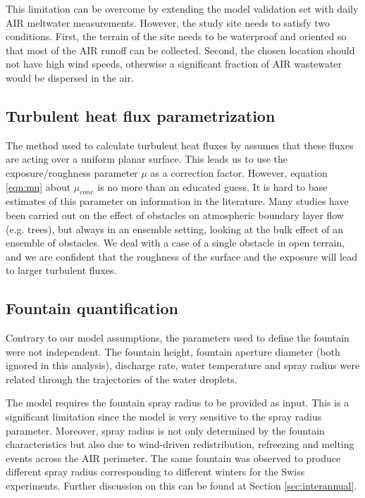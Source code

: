 This limitation can be overcome by extending the model validation set with daily AIR meltwater measurements.
However, the study site needs to satisfy two conditions. First, the terrain of the site needs to be waterproof
and oriented so that most of the AIR runoff can be collected. Second, the chosen location should not have high
wind speeds, otherwise a significant fraction of AIR wastewater would be dispersed in the air.

\subsection{Turbulent heat flux parametrization}


The method used to calculate turbulent heat fluxes by \citet{garrattAtmosphericBoundaryLayer1992} assumes that
these fluxes are acting over a uniform planar surface. This leads us to use the exposure/roughness parameter
$\mu$ as a correction factor. However, equation \ref{eqn:mu} about $\mu_{cone}$ is no more than an educated guess. It
is hard to base estimates of this parameter on information in the literature. Many studies have been carried out
on the effect of obstacles on atmospheric boundary layer flow (e.g. trees), but always in an ensemble setting,
looking at the bulk effect of an ensemble of obstacles. We deal with a case of a single obstacle in open
terrain, and we are confident that the roughness of the surface and the exposure will lead to larger turbulent
fluxes.

\subsection{Fountain quantification}

Contrary to our model assumptions, the parameters used to define the fountain were not independent. The fountain
height, fountain aperture diameter (both ignored in this analysis), discharge rate, water temperature and spray
radius were related through the trajectories of the water droplets.

The model requires the fountain spray radius to be provided as input. This is a significant limitation since the
model is very sensitive to the spray radius parameter. Moreover, spray radius is not only determined by the fountain
characteristics but also due to wind-driven redistribution, refreezing and melting events across the AIR
perimeter. The same fountain was observed to produce different spray radius corresponding to different winters
for the Swiss experiments. Further discussion on this can be found at Section \ref{sec:interannual}.

